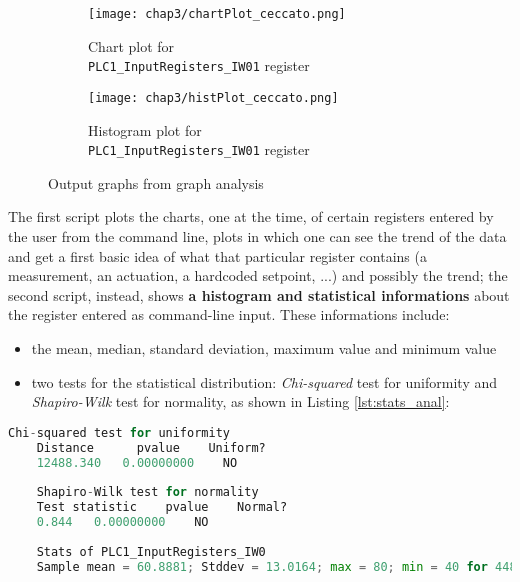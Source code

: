 \begin{figure}[ht]
	\centering
	\begin{subfigure}{0.48\textwidth}
		\texttt{[image: chap3/chartPlot\_ceccato.png]}
		\caption{Chart plot for\\ \textnormal{\texttt{PLC1\_InputRegisters\_IW01}} register}
		\label{subfig:chart_plot_ceccato}
	\end{subfigure}
	\hfill
	\begin{subfigure}{0.48\textwidth}
		\texttt{[image: chap3/histPlot\_ceccato.png]}
		\caption{Histogram plot for\\ \textnormal{\texttt{PLC1\_InputRegisters\_IW01}} register}
		\label{subfig:hist_plot_ceccato}
	\end{subfigure}
	\caption{Output graphs from graph analysis}
	\label{fig:ceccato_graphs}
\end{figure}

The first script plots the charts, one at the time, of certain registers entered by the user from the command line, plots in which one can see the trend of the data and get a first basic idea of what that particular register contains (a measurement, an actuation, a hardcoded setpoint, ...) and possibly the trend; the second script, instead, shows \textbf{a histogram and statistical informations} about the register entered as command-line input. These informations include:

\begin{itemize}
	\item the mean, median, standard deviation, maximum value and minimum value
	
	\item two tests for the statistical distribution: \textit{Chi-squared} test for uniformity and \textit{Shapiro-Wilk} test for normality, as shown in Listing \ref{lst:stats_anal}:

\end{itemize}

\begin{lstlisting}[language=Python,numbers=none,caption={Statistical data for \textnormal{\texttt{PLC1\_InputRegisters\_IW0}} register},label=lst:stats_anal]
	Chi-squared test for uniformity
	Distance      pvalue    Uniform?
	12488.340   0.00000000    NO    
	
	Shapiro-Wilk test for normality
	Test statistic    pvalue    Normal? 
	0.844   0.00000000    NO    
	
	Stats of PLC1_InputRegisters_IW0
	Sample mean = 60.8881; Stddev = 13.0164; max = 80; min = 40 for 4488 values
\end{lstlisting}

